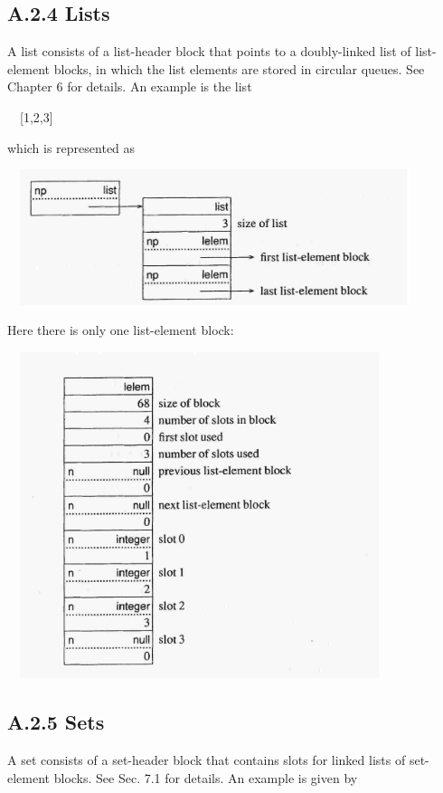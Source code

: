 \subsection{A.2.4 Lists}

A list consists of a list-header block that points to a doubly-linked
list of list-element blocks, in which the list elements are stored in
circular queues. See Chapter 6 for details. An example is the list

{\ttfamily\mdseries
\ \ [1,2,3]}

\noindent which is represented as


\ \  \includegraphics[width=4.489in,height=1.5563in]{ib-img/ib-img117.jpg} 


Here there is only one list-element block:


\ \  \includegraphics[width=4.1681in,height=3.7543in]{ib-img/ib-img118.jpg} 

\subsection{A.2.5 Sets}

A set consists of a set-header block that contains slots for linked
lists of set-element blocks. See Sec. 7.1 for details. An example is
given by

